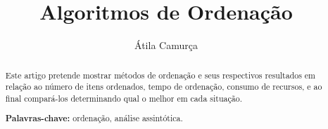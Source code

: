 \documentclass[a4paper,12pt]{article}
\title{Algoritmos de Ordenação}
\author{Átila Camurça}
\begin{document}
\maketitle

\begin{abstract}
Este artigo pretende mostrar métodos de ordenação e seus respectivos
resultados em relação ao número de itens ordenados, tempo de ordenação,
consumo de recursos, e ao final compará-los determinando qual o melhor em cada
situação.

\smallskip
\noindent \textbf{Palavras-chave:} ordenação, análise assintótica.

\end{abstract}



\nocite{harris}
\nocite{santos}

\end{document}

